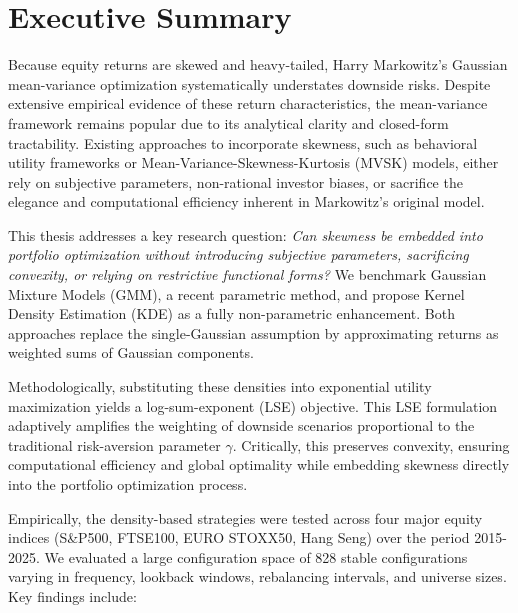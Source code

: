 \chapter*{Executive Summary}

Because equity returns are skewed and heavy-tailed, Harry Markowitz's Gaussian mean-variance optimization systematically understates downside risks. Despite extensive empirical evidence of these return characteristics, the mean-variance framework remains popular due to its analytical clarity and closed-form tractability. Existing approaches to incorporate skewness, such as behavioral utility frameworks or Mean-Variance-Skewness-Kurtosis (MVSK) models, either rely on subjective parameters, non-rational investor biases, or sacrifice the elegance and computational efficiency inherent in Markowitz's original model.

This thesis addresses a key research question: \textit{Can skewness be embedded into portfolio optimization without introducing subjective parameters, sacrificing convexity, or relying on restrictive functional forms?} We benchmark Gaussian Mixture Models (GMM), a recent parametric method, and propose Kernel Density Estimation (KDE) as a fully non-parametric enhancement. Both approaches replace the single-Gaussian assumption by approximating returns as weighted sums of Gaussian components.

Methodologically, substituting these densities into exponential utility maximization yields a log-sum-exponent (LSE) objective. This LSE formulation adaptively amplifies the weighting of downside scenarios proportional to the traditional risk-aversion parameter $\gamma$. Critically, this preserves convexity, ensuring computational efficiency and global optimality while embedding skewness directly into the portfolio optimization process.

Empirically, the density-based strategies were tested across four major equity indices (S\&P500, FTSE100, EURO STOXX50, Hang Seng) over the period 2015-2025. We evaluated a large configuration space of 828 stable configurations varying in frequency, lookback windows, rebalancing intervals, and universe sizes. Key findings include:

